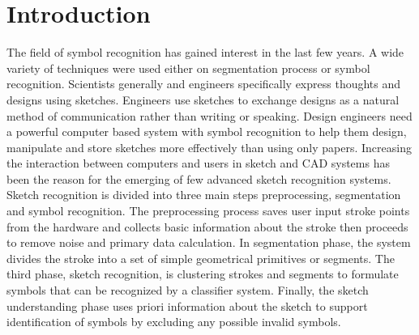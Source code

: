 \documentclass{article}%
\begin{document}
\section{Introduction}
The field of symbol recognition has gained interest in the last few years. A wide variety of techniques were used either on segmentation process or symbol recognition. Scientists generally and engineers specifically express thoughts and designs using sketches. Engineers use sketches to exchange designs as a natural method of communication rather than writing or speaking. %
Design engineers need a powerful computer based system with symbol recognition to help them design, manipulate and store sketches more effectively than using only papers. Increasing the interaction between computers and users in sketch and CAD systems has been the reason for the emerging of few advanced sketch recognition systems. %
Sketch recognition is divided into three main steps preprocessing, segmentation and symbol recognition. The preprocessing process saves user input stroke points from the hardware and collects basic information about the stroke then proceeds to remove noise and primary data calculation. In segmentation phase, the system divides the stroke into a set of simple geometrical primitives or segments. The third phase, sketch recognition, is clustering strokes and segments to formulate symbols that can be recognized by a classifier system. Finally, the sketch understanding phase uses priori information about the sketch to support identification of symbols by excluding any possible invalid symbols. 
\end{document}
